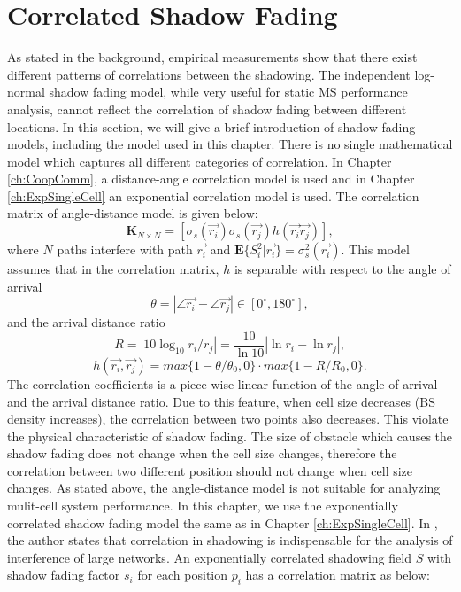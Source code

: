 \section{Correlated Shadow Fading}
\label{CorrShadowField}
As stated in the background, empirical measurements show that there exist different patterns of correlations between the shadowing. The independent log-normal shadow fading model, while very useful for static MS performance analysis, cannot reflect the correlation of shadow fading between different locations. In this section, we will give a brief introduction of shadow fading models, including the model used in this chapter.
There is no single mathematical model which captures all different categories of correlation\cite{szyszkowicz2010feasibility}. In Chapter \ref{ch:CoopComm}, a distance-angle correlation model is used and in Chapter \ref{ch:ExpSingleCell} an exponential correlation model is used. The correlation matrix of angle-distance model is given below:
\begin{equation}
\mathbf{K}_{N\times N} = [ \sigma_{s}(\vec{r_{i}})\sigma_{s}(\vec{r_{j}})h(\vec{r_{i}}\vec{r_{j}})],
\label{correlationmatrix}
\end{equation}
where $N$ paths interfere with path $\vec{r_{i}}$ and $\mathbf{E}\{S_{i}^{2}|\vec{r_{i}}\}=\sigma_{s}^{2}(\vec{r_{i}})$. This model assumes that in the correlation matrix, $h$ is separable with respect to the angle of arrival
\begin{equation}
\theta = |\angle\vec{r_{i}}-\angle\vec{r_{j}}|\in [0^{\circ},180^{\circ}],
\end{equation}
and the arrival distance ratio
\begin{equation}
R=|10\log_{10}r_{i}/r_{j}|=\frac{10}{\ln 10}|\ln r_{i}-\ln r_{j}|,
\end{equation}
\begin{equation}
h(\vec{r_{i}},\vec{r_{j}})=max\{1-\theta/\theta_{0},0\}\cdot max\{1-R/R_{0},0\}.
\end{equation}
The correlation coefficients is a piece-wise linear function of the angle of arrival and the arrival distance ratio. Due to this feature, when cell size decreases (BS density increases), the correlation between two points also decreases. This violate the physical characteristic of shadow fading. The size of obstacle which causes the shadow fading does not change when the cell size changes, therefore the correlation between two different position should not change when cell size changes. As stated above, the angle-distance model is not suitable for analyzing mulit-cell system performance. In this chapter, we use the exponentially correlated shadow fading model \cite{szyszkowicz2011interference} the same as in Chapter \ref{ch:ExpSingleCell}. In \cite{szyszkowicz2011interference}, the author states that correlation in shadowing is indispensable for the analysis of interference of large networks. An exponentially correlated shadowing field $S$ with shadow fading factor $s_{i}$ for each position $p_{i}$ has a correlation matrix as below:
